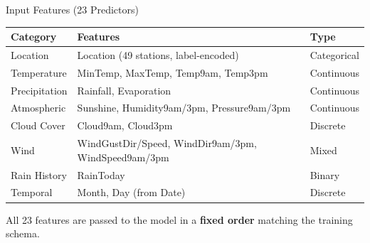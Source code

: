 \documentclass[aspectratio=169]{beamer}
\begin{document}
\begin{frame}{Input Features (23 Predictors)}
  \centering
  \small
  \begin{tabular}{lll}
    \toprule
    \textbf{Category} & \textbf{Features} & \textbf{Type} \\
    \midrule
    Location & Location (49 stations, label-encoded) & Categorical \\
    Temperature & MinTemp, MaxTemp, Temp9am, Temp3pm & Continuous \\
    Precipitation & Rainfall, Evaporation & Continuous \\
    Atmospheric & Sunshine, Humidity9am/3pm, Pressure9am/3pm & Continuous \\
    Cloud Cover & Cloud9am, Cloud3pm & Discrete \\
    Wind & WindGustDir/Speed, WindDir9am/3pm, WindSpeed9am/3pm & Mixed \\
    Rain History & RainToday & Binary \\
    Temporal & Month, Day (from Date) & Discrete \\
    \bottomrule
  \end{tabular}
  \vspace{1em}

  All 23 features are passed to the model in a \textbf{fixed order} matching the training schema.
\end{frame}
\end{document}
